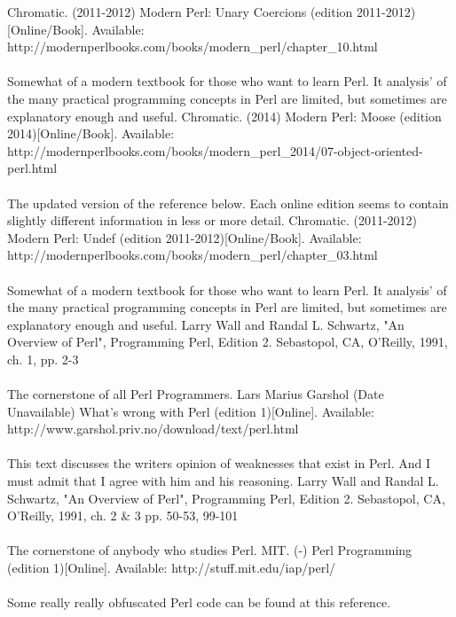 \documentclass[11pt,a4paper]{article}
\begin{document}
\begin{thebibliography}{20}
        Chromatic.
        (2011-2012)
        Modern Perl: Unary Coercions (edition 2011-2012)[Online/Book].
        Available:
        http://modernperlbooks.com/books/modern\_perl/chapter\_10.html  
        \\\\Somewhat of a modern textbook for those who  want to learn Perl. It analysis' of the many practical programming concepts in Perl are limited, but sometimes are explanatory enough and useful.
        Chromatic.
        (2014)
        Modern Perl: Moose (edition 2014)[Online/Book].
        Available:
        http://modernperlbooks.com/books/modern\_perl\_2014/07-object-oriented-perl.html
        \\\\The updated version of the reference below. Each online edition seems to contain slightly different information in less or more detail.        
        Chromatic.
        (2011-2012)
        Modern Perl: Undef (edition 2011-2012)[Online/Book].
        Available:
        http://modernperlbooks.com/books/modern\_perl/chapter\_03.html
        \\\\Somewhat of a modern textbook for those who  want to learn Perl. It analysis' of the many practical programming concepts in Perl are limited, but sometimes are explanatory enough and useful.
        Larry Wall and Randal L. Schwartz,
        "An Overview of Perl",
        Programming Perl,
        Edition 2.
        Sebastopol, CA,
        O'Reilly,
        1991,
        ch. 1,
        pp. 2-3
        \\\\The cornerstone of all Perl Programmers.
        Lars Marius Garshol
        (Date Unavailable)
        What's wrong with Perl (edition 1)[Online].
        Available:
        http://www.garshol.priv.no/download/text/perl.html
        \\\\This text discusses the writers opinion of weaknesses that exist in Perl. And I must admit that I agree with him and his reasoning.
        Larry Wall and Randal L. Schwartz,
        "An Overview of Perl",
        Programming Perl,
        Edition 2.
        Sebastopol, CA,
        O'Reilly,
        1991,
        ch. 2 \& 3
        pp. 50-53, 99-101
        \\\\The cornerstone of anybody who studies Perl. 
        MIT.
        (-)
        Perl Programming (edition 1)[Online].
        Available:
        http://stuff.mit.edu/iap/perl/
        \\\\Some really really obfuscated Perl code can be found at this reference.
        
\end{thebibliography}
\end{document}
